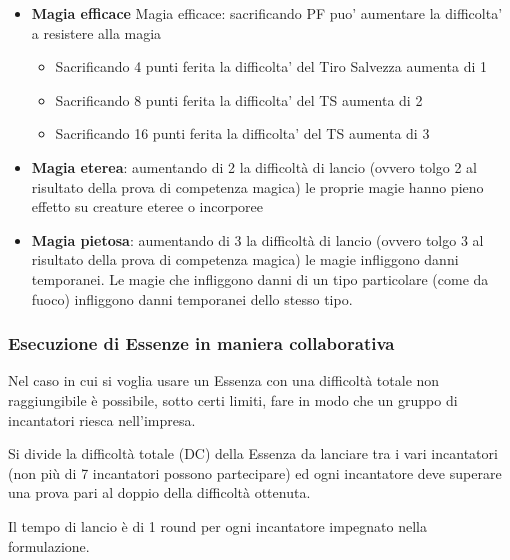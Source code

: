 \documentclass[a4paper,11pt,twoside,openany]{book}
\begin{document}
\begin{itemize}
	\item
	      \textbf{Magia efficace}
	      Magia efficace: sacrificando PF puo’ aumentare la difficolta’ a resistere alla magia
	      \begin{itemize}
		      \item Sacrificando 4 punti ferita la difficolta’ del Tiro Salvezza aumenta di 1
		      \item Sacrificando 8 punti ferita la difficolta’ del TS aumenta di 2

		      \item Sacrificando 16 punti ferita la difficolta’ del TS aumenta di 3
	      \end{itemize}
\end{itemize}
%
\begin{itemize}
	\item
	      \textbf{Magia eterea}: aumentando di 2 la difficoltà di lancio (ovvero tolgo 2 al risultato della prova di competenza magica) le proprie magie hanno pieno effetto su creature eteree o incorporee
\end{itemize}
%
\begin{itemize}
	\item
	      \textbf{Magia pietosa}: aumentando di 3 la difficoltà di lancio (ovvero tolgo 3 al risultato della prova di competenza magica) le magie infliggono danni temporanei. Le magie che infliggono danni di un tipo particolare (come da fuoco) infliggono danni temporanei dello stesso tipo.
\end{itemize}

\subsubsection{Esecuzione di Essenze in maniera collaborativa}

Nel caso in cui si voglia usare un Essenza con una difficoltà totale non raggiungibile è possibile, sotto certi limiti, fare in modo che un gruppo di incantatori riesca nell'impresa.

Si divide la difficoltà totale (DC) della Essenza da lanciare tra i vari incantatori (non più di 7 incantatori possono partecipare) ed ogni incantatore deve superare una prova pari al doppio della difficoltà ottenuta.

Il tempo di lancio è di 1 round per ogni incantatore impegnato nella formulazione.
\end{document}
